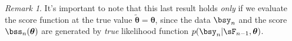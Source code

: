 \documentclass[12pt]{article}
\theoremstyle{plain}
\theoremstyle{definition}
\theoremstyle{remark}
\newtheorem*{rmk}{Remark}
\newcommand{\bstheta}{\boldsymbol{\theta}}
\newcommand{\bstildetheta}{\boldsymbol{\tilde{\theta}}}
\begin{document}
\begin{rmk}
It's important to note that this last result holds \emph{only} if we
evaluate the score function at the true value $\bstildetheta=\bstheta$,
since the data $\bsy_n$ and the score $\bss_n(\bstheta)$ are generated
by \emph{true} likelihood function $p(\bsy_n|\sF_{n-1},\bstheta)$.
\end{rmk}


\end{document}
